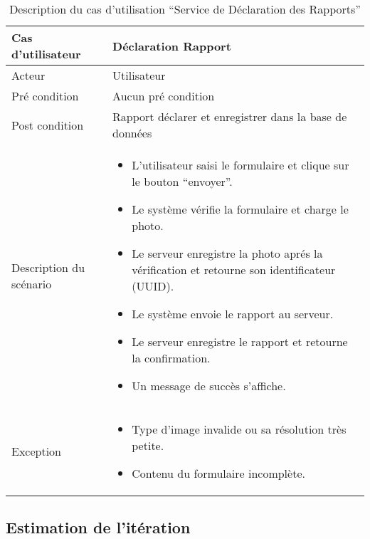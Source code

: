 \begin{table}[H]
    \centering
    \begin{tabular}{| p{3cm} | l |}
        \hline
        Cas d'utilisateur & Déclaration Rapport \\ \hline
        Acteur & Utilisateur \\ \hline
        Pré condition & Aucun pré condition \\ \hline
        Post condition & Rapport déclarer et enregistrer dans la base de données \\ \hline
        Description du scénario &
        \begin{minipage}{11cm}
            \vspace*{0.2cm}
            \begin{itemize}
                \item L'utilisateur saisi le formulaire et clique sur le bouton ``envoyer''.
                \item Le système vérifie la formulaire et charge le photo.
                \item Le serveur enregistre la photo aprés la vérification et retourne son identificateur (UUID).
                \item Le système envoie le rapport au serveur.
                \item Le serveur enregistre le rapport et retourne la confirmation.
                \item Un message de succès s'affiche.
            \end{itemize}
        \end{minipage} \\ \hline
        Exception & \begin{minipage}{11cm}
            \vspace*{0.2cm}
            \begin{itemize}
                \item Type d'image invalide ou sa résolution  très petite.
                \item Contenu du formulaire incomplète.
            \end{itemize}
        \end{minipage}
        \\ \hline
    \end{tabular}
    \caption{Description du cas d'utilisation ``Service de Déclaration des Rapports''}
\end{table}

\subsection{Estimation de l'itération}

